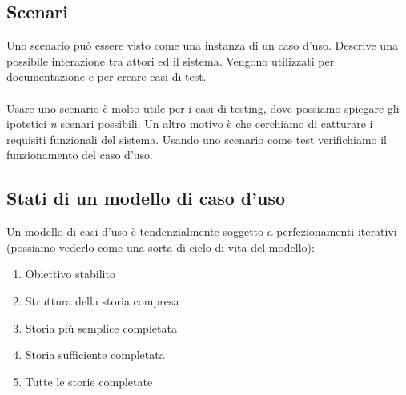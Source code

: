 \documentclass{article}
\begin{document}
\subsection*{Scenari}
\large

Uno scenario può essere visto come una instanza di un caso d'uso. Descrive una possibile interazione tra attori ed il sistema. Vengono utilizzati per documentazione e per creare casi di test.\\ \\
Usare uno scenario è molto utile per i casi di testing, dove possiamo spiegare gli ipotetici \textit{n} scenari possibili. Un altro motivo è che cerchiamo di catturare i requisiti funzionali del sistema. Usando uno scenario come test verifichiamo il funzionamento del caso d'uso.

\subsection*{Stati di un modello di caso d'uso}
\large

Un modello di casi d'uso è tendenzialmente soggetto a perfezionamenti iterativi (possiamo vederlo come una sorta di ciclo di vita del modello):
\begin{enumerate}
    \renewcommand{\labelenumi}{-}
    \item Obiettivo stabilito
    \item Struttura della storia compresa
    \item Storia più semplice completata
    \item Storia sufficiente completata
    \item Tutte le storie completate
\end{enumerate}
\end{document}
